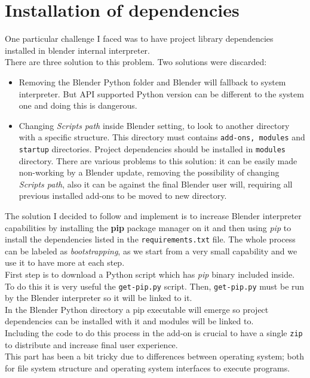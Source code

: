 \section{Installation of dependencies}
One particular challenge I faced was to have project library dependencies installed in blender internal interpreter. \\
There are three solution to this problem. Two solutions were discarded: 
\begin{itemize}
\item Removing the Blender Python folder and Blender will fallback to system interpreter. But API supported Python version can be different to the system one and doing this is dangerous.
\item Changing \textit{Scripts path} inside Blender setting, to look to another directory with a specific structure. This directory must contains \texttt{add-ons, modules} and \texttt{startup} directories. Project dependencies should be installed in \texttt{modules} directory. There are various problems to this solution: it can be easily made non-working by a Blender update, removing the possibility of changing \textit{Scripts path}, also it can be against the final Blender user will, requiring all previous installed add-ons to be moved to new directory.
\end{itemize}
The solution I decided to follow and implement is to increase Blender interpreter capabilities by installing the \textbf{pip} package manager on it and then using \textit{pip} to install the dependencies listed in the \texttt{requirements.txt} file. The whole process can be labeled as \textit{bootstrapping}, as we start from a very small capability and we use it to have more at each step. \\
First step is to download a Python script which has \textit{pip} binary included inside. To do this it is very useful the \texttt{get-pip.py} script. \cite{get-pip}
Then, \texttt{get-pip.py} must be run by the Blender interpreter so it will be linked to it.  \\
In the Blender Python directory a pip executable will emerge so project dependencies can be installed with it and modules will be linked to. \\
Including the code to do this process in the add-on is crucial to have a single \texttt{zip} to distribute and increase final user experience. \\
This part has been a bit tricky due to differences between operating system; both for file system structure and operating system interfaces to execute programs. \\
